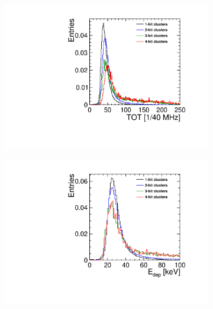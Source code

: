 \begin{figure}[htbp] \centering
  \begin{subfigure}[b]{0.32\textwidth}
    \includegraphics[width=\textwidth]{./figures/Calibration/TOT_Clusters_W0005_E02.pdf}
    \caption{}
  \end{subfigure}\hfill
  \begin{subfigure}[b]{0.32\textwidth}
    \includegraphics[width=\textwidth]{./figures/Calibration/Edep_Clusters_W0005_E02.pdf}
    \caption{}
  \end{subfigure}\hfill
  \begin{subfigure}[b]{0.32\textwidth}

\end{subfigure}
\end{figure}

